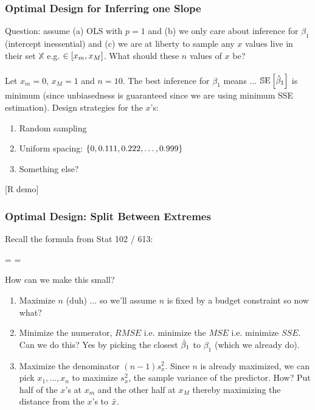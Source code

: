 \documentclass[slides]{beamer} %
\begin{document}
\begin{frame}\frametitle{Optimal Design for Inferring one Slope}

Question: assume (a) OLS with $p=1$ and \pause (b) we only care about inference for $\beta_1$ (intercept inessential) and \pause (c) we are at liberty to sample any $x$ values live in their set $\mathbb{X}$ e.g. $\in \left[x_m, x_M\right]$. What should these $n$ values of $x$ be? \\~\\

Let $x_m = 0$, $x_M = 1$ and $n = 10$. The best inference for $\beta_1$ means ... \pause $\mathbb{S}\text{E}\left[\hat{\beta}_1\right]$ is minimum (since unbiasedness is guaranteed since we are using minimum SSE estimation). Design strategies for the $x$'s: \pause

\begin{enumerate}
\item Random sampling \pause
\item Uniform spacing: $\left\{0, 0.111, 0.222, \ldots, 0.999\right\}$ \pause
\item Something else?
\end{enumerate}

[R demo]

\end{frame}


\begin{frame}\frametitle{Optimal Design: Split Between Extremes}

Recall the formula from Stat 102 / 613:

\beqn
{} =  = 
\eeqn

How can we make this small? \pause 

\begin{enumerate}
\item Maximize $n$ (duh) ... so we'll assume $n$ is fixed by a budget constraint so now what? \pause
\item Minimize the numerator, $RMSE$ i.e. minimize the $MSE$ i.e. minimize $SSE$. Can we do this? \pause Yes by picking the closest $\hat{\beta}_1$ to $\beta_1$ (which we already do). \pause
\item Maximize the denominator $(n-1) s^2_x$. Since $n$ is already maximized, we can pick $x_1, \ldots, x_n$ to maximize $s^2_x$, the sample variance of the predictor.  How? \pause Put half of the $x$'s at $x_m$ and the other half at $x_M$ thereby \pause maximizing the distance from the $x$'s to \pause $\bar{x}$.
\end{enumerate}
	
\end{frame}
\end{document}
